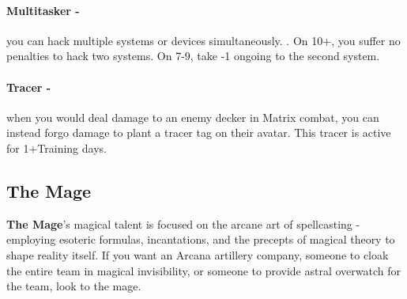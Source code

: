 \paragraph{Multitasker -} you can hack multiple systems or devices simultaneously. . On 10+, you suffer no penalties to hack two systems. On 7-9, take -1 ongoing to the second system.

\paragraph{Tracer -} when you would deal damage to an enemy decker in Matrix combat, you can instead forgo damage to plant a tracer tag on their avatar. This tracer is active for 1+Training days.



\clearpage
\subsection{The Mage}
\textbf{The Mage}’s magical talent is focused on the arcane art of spellcasting - employing esoteric formulas, incantations, and the precepts of magical theory to shape reality itself. If you want an Arcana artillery company, someone to cloak the entire team in magical invisibility, or someone to provide astral overwatch for the team, look to the mage.

